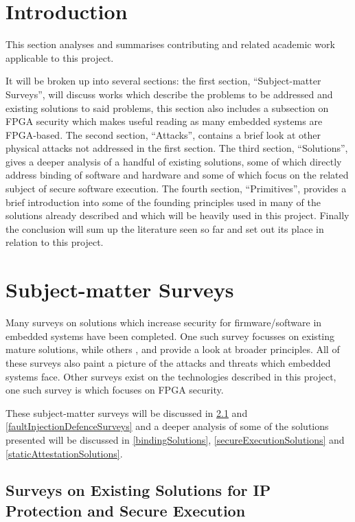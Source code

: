 \section{Introduction}\label{litIntroduction}

This section analyses and summarises contributing and related academic work applicable to this project.

It will be broken up into several sections: the first section, ``Subject-matter Surveys'', will discuss works which describe the problems to be addressed and existing solutions to said problems, this section also includes a subsection on FPGA security which makes useful reading as many embedded systems are FPGA-based. The second section, ``Attacks'', contains a brief look at other physical attacks not addressed in the first section. The third section, ``Solutions'', gives a deeper analysis of a handful of existing solutions, some of which directly address binding of software and hardware and some of which focus on the related subject of secure software execution. The fourth section, ``Primitives'', provides a brief introduction into some of the founding principles used in many of the solutions already described and which will be heavily used in this project. Finally the conclusion will sum up the literature seen so far and set out its place in relation to this project.

\section{Subject-matter Surveys}\label{subjectMatterSurveys}

Many surveys on solutions which increase security for firmware/software in embedded systems have been completed. One such survey \cite{Shepherd2016} focusses on existing mature solutions, while others \cite{Bryant2004}, \cite{Collberg2002} and \cite{Theissing2013} provide a look at broader principles. All of these surveys also paint a picture of the attacks and threats which embedded systems face. Other surveys exist on the technologies described in this project, one such survey is \cite{Drimer2008} which focuses on FPGA security.

These subject-matter surveys will be discussed in \ref{solutionSurveys} and \ref{faultInjectionDefenceSurveys} and a deeper analysis of some of the solutions presented will be discussed in \ref{bindingSolutions}, \ref{secureExecutionSolutions} and \ref{staticAttestationSolutions}.


\subsection{Surveys on Existing Solutions for IP Protection and Secure Execution}\label{solutionSurveys}

